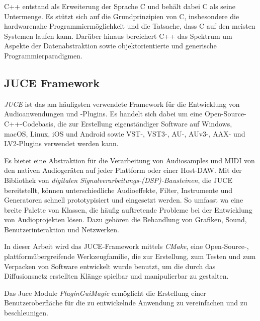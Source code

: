 \documentclass[
  a4paper,  %
  twoside,  %
  bibliography=totoc,
  headsepline,
  cleardoublepage=empty,
  parskip=half,
  draft=false
]{scrbook}
\begin{document}
C++ entstand als Erweiterung der Sprache C und behält dabei C als seine Untermenge. Es stützt sich auf die Grundprinzipien von C, insbesondere die hardwarenahe Programmiermöglichkeit und die Tatsache, dass C auf den meisten Systemen laufen kann. Darüber hinaus bereichert C++ das Spektrum um Aspekte der Datenabstraktion sowie objektorientierte und generische Programmierparadigmen. \cite{stroustrup_c_1997}
\subsection{JUCE Framework}
\glqq\emph{JUCE} ist das am häufigsten verwendete Framework für die Entwicklung von Audioanwendungen und -Plugins. Es handelt sich dabei um eine Open-Source-C++-Codebasis, die zur Erstellung eigenständiger Software auf Windows, macOS, Linux, iOS und Android sowie VST-, VST3-, AU-, AUv3-, AAX- und LV2-Plugins verwendet werden kann.\grqq \cite{noauthor_juce_nodate}

Es bietet eine Abstraktion für die Verarbeitung von Audiosamples und MIDI von den nativen Audiogeräten auf jeder Plattform oder einer Host-DAW. Mit der Bibliothek von \emph{digitalen Signalverarbeitungs-(DSP)-Bausteinen}, die JUCE bereitstellt, können unterschiedliche Audioeffekte, Filter, Instrumente und Generatoren schnell prototypisiert und eingesetzt werden. \cite{noauthor_juce_nodate} So umfasst wa eine breite Palette von Klassen, die häufig auftretende Probleme bei der Entwicklung von Audioprojekten lösen. Dazu gehören die Behandlung von Grafiken, Sound, Benutzerinteraktion und Netzwerken. \cite{robinson_getting_2013}

In dieser Arbeit wird das JUCE-Framework mittels \emph{CMake}, \glqq eine Open-Source-, plattformübergreifende Werkzeugfamilie, die zur Erstellung, zum Testen und zum Verpacken von Software entwickelt wurde\grqq \cite{noauthor_cmake_nodate} benutzt, um die durch das Diffusionsnetz erstellten Klänge spielbar und manipulierbar zu gestalten. 

Das Juce Module \emph{PluginGuiMagic} \cite{walz_plugin_nodate} ermöglicht die Erstellung einer Benutzeroberfläche für die zu entwickelnde Anwendung zu vereinfachen und zu beschleunigen. 
\end{document}
